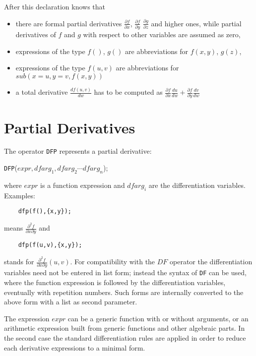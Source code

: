 After this declaration {\REDUCE} knows that
\begin{itemize}
\item there are formal partial derivatives $\frac{\partial f}{\partial x}$,
$\frac{\partial f}{\partial y}$ $\frac{\partial g}{\partial z}$
and higher ones, while partial derivatives of $f$ and $g$
with respect to other variables are assumed as zero,
\item expressions of the type $f()$, $g()$ are abbreviations for
$f(x,y)$, $g(z)$,
\item expressions of the type $f(u,v)$ are abbreviations for\\
$sub(x=u,y=v,f(x,y))$
\item a total derivative $\frac{d f(u,v)}{d w}$ has to be computed
as $\frac{\partial f}{\partial x} \frac{d u}{d w} +
    \frac{\partial f}{\partial y} \frac{d v}{d w}$
\end{itemize}

\section{Partial Derivatives}

The operator {\tt DFP} represents a partial derivative:

\vspace{.1in}
 {\tt DFP}($expr,{dfarg_1,dfarg_2\cdots dfarg_n}$);
\vspace{.1in}

\noindent
where $expr$ is a function expression and $dfarg_i$ are
the differentiation variables. Examples:

\begin{verbatim}
    dfp(f(),{x,y});
\end{verbatim}
means $\frac{\partial ^2 f}{\partial x \partial y}$ and
\begin{verbatim}
    dfp(f(u,v),{x,y});
\end{verbatim}
stands for $\frac{\partial ^2 f}{\partial x \partial y} (u,v)$.
For compatibility with the $DF$ operator the differentiation
variables need not be entered in list form; instead the syntax
of {\tt DF} can be used, where the function expression is followed
by the differentiation variables, eventually with repetition
numbers. Such forms are internally converted to the above
form with a list as second parameter.

The expression $expr$ can be a generic function
with or without arguments, or an arithmetic expression built
from generic functions and other algebraic parts. In the
second case the standard differentiation rules are applied
in order to reduce each derivative expressions to a minimal
form.

